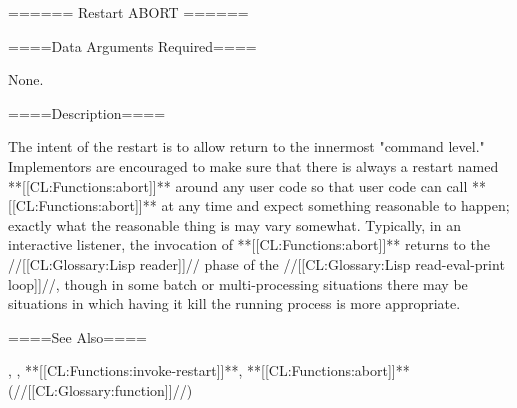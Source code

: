 ====== Restart ABORT ======

====Data Arguments Required====

None.

====Description====

The intent of the  restart is to allow return to the innermost "command level." Implementors are encouraged to make sure that there is always a restart named **[[CL:Functions:abort]]** around any user code so that user code can call **[[CL:Functions:abort]]** at any time and expect something reasonable to happen; exactly what the reasonable thing is may vary somewhat. Typically, in an interactive listener, the invocation of **[[CL:Functions:abort]]** returns to the //[[CL:Glossary:Lisp reader]]// phase of the //[[CL:Glossary:Lisp read-eval-print loop]]//, though in some batch or multi-processing situations there may be situations in which having it kill the running process is more appropriate.

====See Also====

\secref\Restarts, {\secref\InterfacesToRestarts}, **[[CL:Functions:invoke-restart]]**, **[[CL:Functions:abort]]** (//[[CL:Glossary:function]]//)

